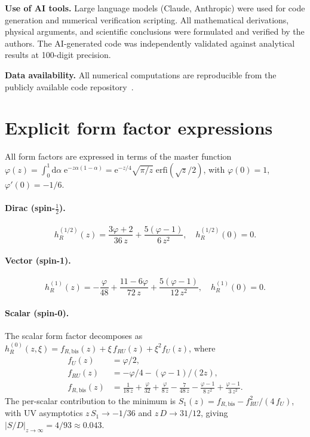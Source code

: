 \documentclass[12pt,a4paper]{article}
\newcommand{\half}{\tfrac{1}{2}}
\newcommand{\dd}{\mathrm{d}}
\newcommand{\ee}{\mathrm{e}}
\begin{document}
\bigskip
\noindent\textbf{Use of AI tools.}
Large language models (Claude, Anthropic) were used for code generation
and numerical verification scripting.
All mathematical derivations, physical arguments, and scientific conclusions
were formulated and verified by the authors. The AI-generated code was
independently validated against analytical results at 100-digit precision.

\bigskip
\noindent\textbf{Data availability.}
All numerical computations are reproducible from the publicly available
code repository~\cite{SCTrepo}.

\appendix
\section{Explicit form factor expressions}
\label{app:formulas}

All form factors are expressed in terms of the master function
$\varphi(z) = \int_0^1 \dd\alpha\;\ee^{-z\alpha(1-\alpha)}
= \ee^{-z/4}\sqrt{\pi/z}\;\mathrm{erfi}(\sqrt{z}/2)$,
with $\varphi(0) = 1$, $\varphi'(0) = -1/6$.

\paragraph{Dirac (spin-$\half$).}
\begin{equation}\label{eq:hR-dirac}
  h_R^{(1/2)}(z) = \frac{3\varphi + 2}{36\,z} + \frac{5(\varphi - 1)}{6\,z^2},
  \quad h_R^{(1/2)}(0) = 0.
\end{equation}

\paragraph{Vector (spin-1).}
\begin{equation}\label{eq:hR-vector}
  h_R^{(1)}(z) = -\frac{\varphi}{48} + \frac{11 - 6\varphi}{72\,z}
  + \frac{5(\varphi - 1)}{12\,z^2},
  \quad h_R^{(1)}(0) = 0.
\end{equation}

\paragraph{Scalar (spin-0).}
The scalar form factor decomposes as
$h_R^{(0)}(z,\xi) = f_{R,\mathrm{bis}}(z) + \xi\,f_{RU}(z) + \xi^2 f_U(z)$,
where
\begin{align}
  f_U(z) &= \varphi/2, \\
  f_{RU}(z) &= -\varphi/4 - (\varphi - 1)/(2z), \\
  f_{R,\mathrm{bis}}(z) &= \frac{1}{18\,z} + \frac{\varphi}{32}
    + \frac{\varphi}{8\,z} - \frac{7}{48\,z} - \frac{\varphi - 1}{8\,z^2}
    + \frac{\varphi - 1}{3\,z^2}.
\end{align}
The per-scalar contribution to the minimum is
$S_1(z) = f_{R,\mathrm{bis}} - f_{RU}^2/(4\,f_U)$, with UV asymptotics
$z\,S_1 \to -1/36$ and $z\,D \to 31/12$, giving
$|S/D|_{z\to\infty} = 4/93 \approx 0.043$.
\end{document}
